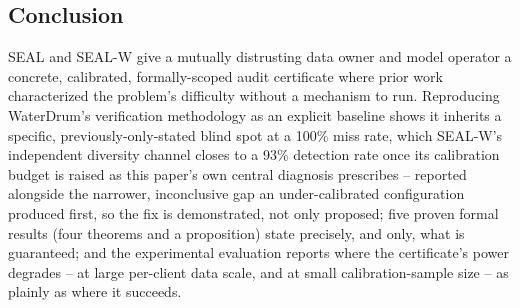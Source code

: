 \documentclass[10pt,journal,compsoc]{IEEEtran}
\begin{document}
\subsection{Conclusion}

SEAL and SEAL-W give a mutually distrusting data owner and model operator a concrete, calibrated, formally-scoped audit certificate where prior work characterized the problem's difficulty without a mechanism to run. Reproducing WaterDrum's verification methodology as an explicit baseline shows it inherits a specific, previously-only-stated blind spot at a 100\% miss rate, which SEAL-W's independent diversity channel closes to a 93\% detection rate once its calibration budget is raised as this paper's own central diagnosis prescribes -- reported alongside the narrower, inconclusive gap an under-calibrated configuration produced first, so the fix is demonstrated, not only proposed; five proven formal results (four theorems and a proposition) state precisely, and only, what is guaranteed; and the experimental evaluation reports where the certificate's power degrades -- at large per-client data scale, and at small calibration-sample size -- as plainly as where it succeeds.



\end{document}
